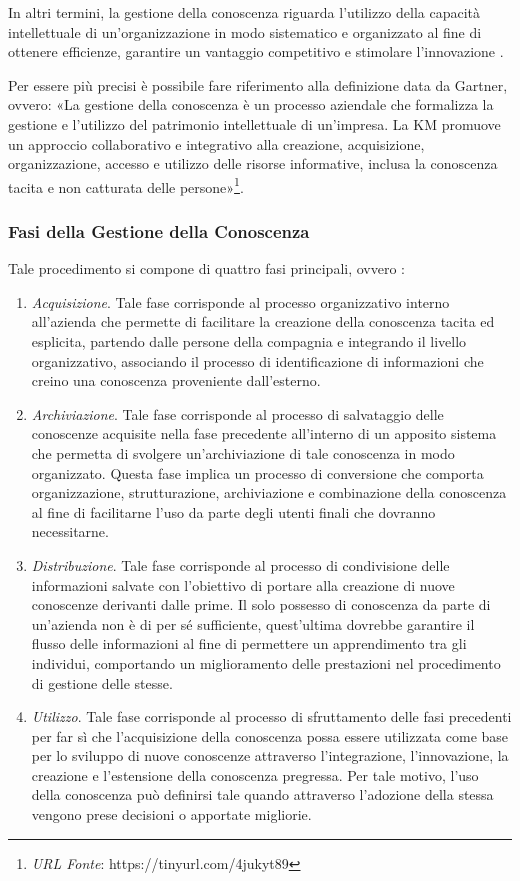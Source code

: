 In altri termini, la gestione della conoscenza riguarda l'utilizzo della capacità intellettuale di un'organizzazione in modo sistematico e organizzato al fine di ottenere efficienze, garantire un vantaggio competitivo e stimolare l'innovazione \cite{ieee_enterprise_knowledge_management}.

Per essere più precisi è possibile fare riferimento alla definizione data da Gartner, ovvero: «La gestione della conoscenza è un processo aziendale che formalizza la gestione e l'utilizzo del patrimonio intellettuale di un'impresa. La KM promuove un approccio collaborativo e integrativo alla creazione, acquisizione, organizzazione, accesso e utilizzo delle risorse informative, inclusa la conoscenza tacita e non catturata delle persone»\footnote{\textit{URL Fonte}: https://tinyurl.com/4jukyt89}.

\subsubsection{Fasi della Gestione della Conoscenza}

Tale procedimento si compone di quattro fasi principali, ovvero \cite{knowledge_management_process}:
\begin{enumerate}
    \item \textit{Acquisizione}. Tale fase corrisponde al processo organizzativo interno all'azienda che permette di facilitare la creazione della conoscenza tacita ed esplicita, partendo dalle persone della compagnia e integrando il livello organizzativo, associando il processo di identificazione di informazioni che creino una conoscenza proveniente dall'esterno.
    \item \textit{Archiviazione}. Tale fase corrisponde al processo di salvataggio delle conoscenze acquisite nella fase precedente all'interno di un apposito sistema che permetta di svolgere un'archiviazione di tale conoscenza in modo organizzato. Questa fase implica un processo di conversione che comporta organizzazione, strutturazione, archiviazione e combinazione della conoscenza al fine di facilitarne l'uso da parte degli utenti finali che dovranno necessitarne.
    \item \textit{Distribuzione}. Tale fase corrisponde al processo di condivisione delle informazioni salvate con l'obiettivo di portare alla creazione di nuove conoscenze derivanti dalle prime. Il solo possesso di conoscenza da parte di un'azienda non è di per sé sufficiente, quest'ultima dovrebbe garantire il flusso delle informazioni al fine di permettere un apprendimento tra gli individui, comportando un miglioramento delle prestazioni nel procedimento di gestione delle stesse.
    \item \textit{Utilizzo}. Tale fase corrisponde al processo di sfruttamento delle fasi precedenti per far sì che l'acquisizione della conoscenza possa essere utilizzata come base per lo sviluppo di nuove conoscenze attraverso l'integrazione, l'innovazione, la creazione e l'estensione della conoscenza pregressa. Per tale motivo, l'uso della conoscenza può definirsi tale quando attraverso l'adozione della stessa vengono prese decisioni o apportate migliorie.
\end{enumerate}

